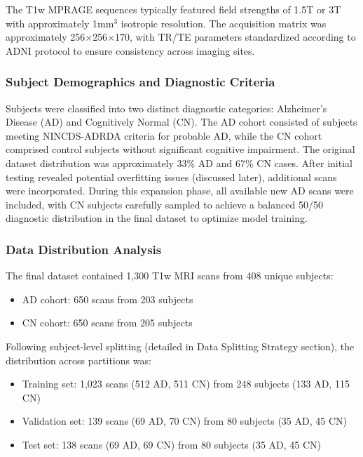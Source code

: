 \documentclass[12pt, a4paper]{article}
\begin{document}
The T1w MPRAGE sequences typically featured field strengths of 1.5T or 3T with approximately 1mm$^3$ isotropic resolution. The acquisition matrix was approximately 256$\times$256$\times$170, with TR/TE parameters standardized according to ADNI protocol to ensure consistency across imaging sites.

\subsubsection{Subject Demographics and Diagnostic Criteria}

Subjects were classified into two distinct diagnostic categories: Alzheimer's Disease (AD) and Cognitively Normal (CN). The AD cohort consisted of subjects meeting NINCDS-ADRDA criteria for probable AD, while the CN cohort comprised control subjects without significant cognitive impairment. The original dataset distribution was approximately 33\% AD and 67\% CN cases. After initial testing revealed potential overfitting issues (discussed later), additional scans were incorporated. During this expansion phase, all available new AD scans were included, with CN subjects carefully sampled to achieve a balanced 50/50 diagnostic distribution in the final dataset to optimize model training.

\subsubsection{Data Distribution Analysis}

The final dataset contained 1,300 T1w MRI scans from 408 unique subjects:
\begin{itemize}
    \item AD cohort: 650 scans from 203 subjects
    \item CN cohort: 650 scans from 205 subjects
\end{itemize}

Following subject-level splitting (detailed in Data Splitting Strategy section), the distribution across partitions was:
\begin{itemize}
    \item Training set: 1,023 scans (512 AD, 511 CN) from 248 subjects (133 AD, 115 CN)
    \item Validation set: 139 scans (69 AD, 70 CN) from 80 subjects (35 AD, 45 CN)
    \item Test set: 138 scans (69 AD, 69 CN) from 80 subjects (35 AD, 45 CN)
\end{itemize}
\end{document}

